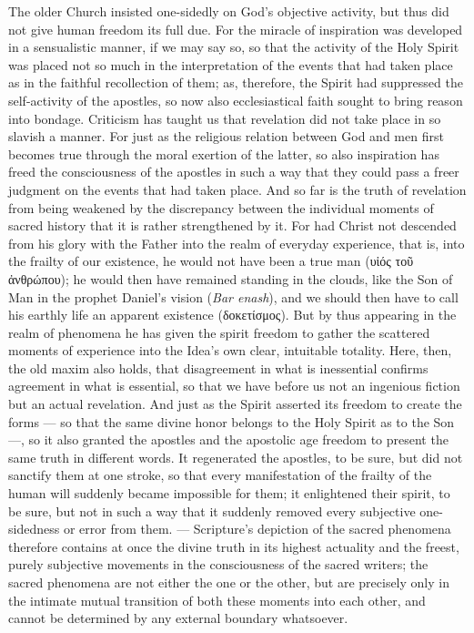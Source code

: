 \documentclass[12pt]{book}
\newcommand{\opage}[1]{\marginnote{\footnotesize\textit{[#1]}}}
\begin{document}
The older Church insisted one-sidedly on God's objective activity, but thus did
not give human freedom its full due. For the miracle of inspiration was developed
in a sensualistic manner, if we may say so, so that the activity of the Holy
Spirit was placed not so much in the interpretation of the
\opage{159} %
events that had taken place as in the faithful recollection of them; as,
therefore, the Spirit had suppressed the self-activity of the apostles, so now
also ecclesiastical faith sought to bring reason into bondage. Criticism has
taught us that revelation did not take place in so slavish a manner. For just as
the religious relation between God and men first becomes true through the moral
exertion of the latter, so also inspiration has freed the consciousness of the
apostles in such a way that they could pass a freer judgment on the events that
had taken place. And so far is the truth of revelation from being weakened by the
discrepancy between the individual moments of sacred history that it is rather
strengthened by it. For had Christ not descended from his glory with the Father
into the realm of everyday experience, that is, into the frailty of our
existence, he would not have been a true man (υἱός τοῦ ἀνθρώπου); he would then
have remained standing in the clouds, like the Son of Man in the prophet Daniel's
vision (\emph{Bar enash}), and we should then have to call his earthly life an
apparent existence (δοκετίσμος). But by thus appearing in the realm of phenomena
he has given the spirit freedom to gather the scattered moments of experience
into the Idea's own clear, intuitable totality. Here, then, the old maxim also
holds, that disagreement in what is inessential confirms agreement in what is
essential, so that we have before us not an ingenious fiction but an actual
revelation. And just as the Spirit asserted its freedom to create the forms ---
so that the same divine honor belongs to the Holy Spirit as to the Son ---, so it
also granted the apostles and the apostolic age freedom to present the same truth
in different words. It regenerated the apostles, to be sure, but did not
sanctify them at one stroke, so that every manifestation of the frailty of the
human will
\opage{160} %
suddenly became impossible for them; it enlightened their spirit, to be sure,
but not in such a way that it suddenly removed every subjective one-sidedness or
error from them. --- Scripture's depiction of the sacred phenomena therefore
contains at once the divine truth in its highest actuality and the freest,
purely subjective movements in the consciousness of the sacred writers; the
sacred phenomena are not either the one or the other, but are precisely only in
the intimate mutual transition of both these moments into each other, and cannot
be determined by any external boundary whatsoever.
\end{document}
